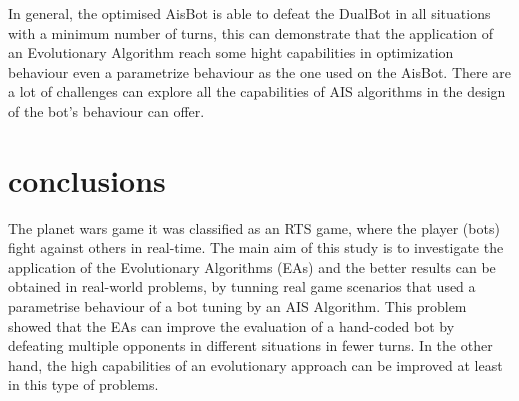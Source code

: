\documentclass[]{interact}
\theoremstyle{plain}%
\theoremstyle{definition}
\theoremstyle{remark}
\begin{document}
In general, the optimised AisBot is able to defeat the DualBot in all situations with a minimum number of turns, this can demonstrate that the application of an Evolutionary Algorithm reach some hight capabilities in optimization behaviour even a parametrize behaviour as the one used on the AisBot. There are a lot of challenges can explore all the capabilities of AIS algorithms in the design of the bot's behaviour can offer.


\section{conclusions}
The planet wars game it was classified as an RTS game, where the player (bots) fight against others in real-time. The main aim of this study is to investigate the application of the Evolutionary Algorithms (EAs) and the better results can be obtained in real-world problems, by tunning real game scenarios that used a parametrise behaviour of a bot tuning by an AIS Algorithm. This problem showed that the EAs can improve the evaluation of a hand-coded bot by defeating multiple opponents in different situations in fewer turns. In the other hand, the high capabilities of an evolutionary approach can be improved at least in this type of problems.





\end{document}
